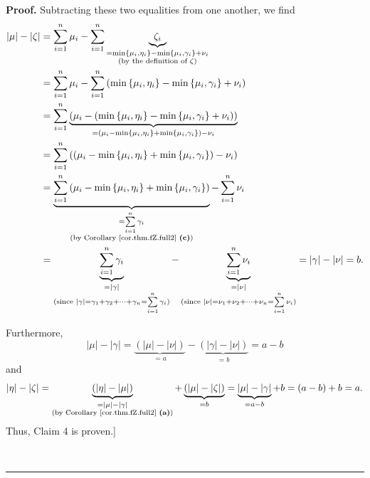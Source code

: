 \documentclass[numbers=enddot,12pt,final,onecolumn,notitlepage]{scrartcl}%
\theoremstyle{definition}
\newenvironment{proof}[1][Proof]{\noindent\textbf{#1.} }{\ \rule{0.5em}{0.5em}}
\let\sumnonlimits\sum
\renewcommand{\sum}{\sumnonlimits\limits}
\newenvironment{verlong}{}{}
\begin{document}
\begin{proof}
\begin{verlong}
\noindent Subtracting these two equalities from one another, we find%
\begin{align*}
\left\vert \mu\right\vert -\left\vert \zeta\right\vert  &  =\sum_{i=1}^{n}%
\mu_{i}-\sum_{i=1}^{n}\underbrace{\zeta_{i}}_{\substack{=\min\left\{  \mu
_{i},\eta_{i}\right\}  -\min\left\{  \mu_{i},\gamma_{i}\right\}  +\nu
_{i}\\\text{(by the definition of }\zeta\text{)}}}\\
&  =\sum_{i=1}^{n}\mu_{i}-\sum_{i=1}^{n}\left(  \min\left\{  \mu_{i},\eta
_{i}\right\}  -\min\left\{  \mu_{i},\gamma_{i}\right\}  +\nu_{i}\right) \\
&  =\sum_{i=1}^{n}\underbrace{\left(  \mu_{i}-\left(  \min\left\{  \mu
_{i},\eta_{i}\right\}  -\min\left\{  \mu_{i},\gamma_{i}\right\}  +\nu
_{i}\right)  \right)  }_{=\left(  \mu_{i}-\min\left\{  \mu_{i},\eta
_{i}\right\}  +\min\left\{  \mu_{i},\gamma_{i}\right\}  \right)  -\nu_{i}}\\
&  =\sum_{i=1}^{n}\left(  \left(  \mu_{i}-\min\left\{  \mu_{i},\eta
_{i}\right\}  +\min\left\{  \mu_{i},\gamma_{i}\right\}  \right)  -\nu
_{i}\right) \\
&  =\underbrace{\sum_{i=1}^{n}\left(  \mu_{i}-\min\left\{  \mu_{i},\eta
_{i}\right\}  +\min\left\{  \mu_{i},\gamma_{i}\right\}  \right)
}_{\substack{=\sum_{i=1}^{n}\gamma_{i}\\\text{(by Corollary
\ref{cor.thm.fZ.full2} \textbf{(c)})}}}-\sum_{i=1}^{n}\nu_{i}\\
&  =\underbrace{\sum_{i=1}^{n}\gamma_{i}}_{\substack{=\left\vert
\gamma\right\vert \\\text{(since }\left\vert \gamma\right\vert =\gamma
_{1}+\gamma_{2}+\cdots+\gamma_{n}=\sum_{i=1}^{n}\gamma_{i}\text{)}%
}}-\underbrace{\sum_{i=1}^{n}\nu_{i}}_{\substack{=\left\vert \nu\right\vert
\\\text{(since }\left\vert \nu\right\vert =\nu_{1}+\nu_{2}+\cdots+\nu_{n}%
=\sum_{i=1}^{n}\nu_{i}\text{)}}}=\left\vert \gamma\right\vert -\left\vert
\nu\right\vert =b.
\end{align*}

\end{verlong}

\noindent Furthermore,%
\[
\left\vert \mu\right\vert -\left\vert \gamma\right\vert =\underbrace{\left(
\left\vert \mu\right\vert -\left\vert \nu\right\vert \right)  }_{=a}%
-\underbrace{\left(  \left\vert \gamma\right\vert -\left\vert \nu\right\vert
\right)  }_{=b}=a-b
\]
and%
\[
\left\vert \eta\right\vert -\left\vert \zeta\right\vert =\underbrace{\left(
\left\vert \eta\right\vert -\left\vert \mu\right\vert \right)  }%
_{\substack{=\left\vert \mu\right\vert -\left\vert \gamma\right\vert
\\\text{(by Corollary \ref{cor.thm.fZ.full2} \textbf{(a)})}}%
}+\underbrace{\left(  \left\vert \mu\right\vert -\left\vert \zeta\right\vert
\right)  }_{=b}=\underbrace{\left\vert \mu\right\vert -\left\vert
\gamma\right\vert }_{=a-b}+b=\left(  a-b\right)  +b=a.
\]
Thus, Claim 4 is proven.]


\end{proof}
\end{document}
